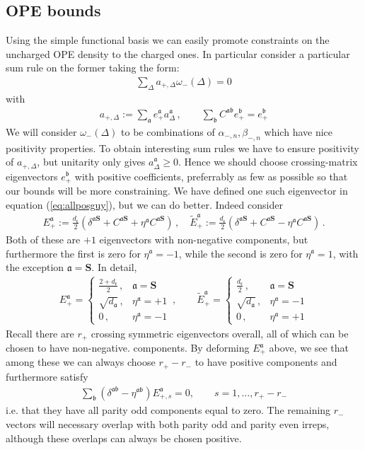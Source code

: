 \documentclass[12pt]{article}
\numberwithin{equation}{section}
\newcommand{\reef}[1]{(\ref{#1})}
\newcommand{\bea}{\begin{eqnarray}}
\newcommand{\eea}{\end{eqnarray}}
\newcommand{\mbf}{\mathbf}
\newcommand{\mf}[1]{\mathfrak #1}
\begin{document}
	\subsection{OPE bounds}
	\label{sec:opebounds}
	Using the simple functional basis we can easily promote constraints on the uncharged OPE density to the charged ones. In particular consider a particular sum rule on the former taking the form:
	\bea
	\sum_{\Delta} a_{+,\Delta} \omega_-(\Delta)=0
	\eea
	with
	\bea
	a_{+,\Delta}:=\sum_{\mf a} e^{\mf a}_+ a^{\mf a}_{\Delta}\,, \qquad \sum_{\mf b} C^{\mf a \mf b} e_{+}^{\mf b}=e_{+}^{\mf b}
	\eea
	We will consider $\omega_-(\Delta)$ to be combinations of $\alpha_{-,n}, \beta_{-,n}$ which have nice positivity properties. To obtain interesting sum rules we have to ensure positivity of $a_{+,\Delta}$, but unitarity only gives $a^{\mf a}_\Delta\geq 0$. Hence we should choose crossing-matrix eigenvectors $e_+^{\mf b}$ with positive coefficients, preferrably as few as possible so that our bounds will be more constraining. We have defined one such eigenvector in equation \reef{eq:allposguy}, but we can do better. Indeed consider
	\bea
	E_{+}^{\mf a}:=\frac{d_{\mf r}}2\left(\delta^{\mf a \mbf S}+C^{\mf a \mbf S}+\eta^{\mf a} C^{\mf a \mbf S}\right)\,,\quad \tilde E_{+}^{\mf a}:=\frac {d_{\mf r}}2\left(\delta^{\mf a \mbf S}+C^{\mf a \mbf S}-\eta^{\mf a} C^{\mf a \mbf S}\right)\,.
	\eea
	Both of these are $+1$ eigenvectors with non-negative components, but furthermore the first is zero for $\eta^{\mf a}=-1$, while the second is zero for $\eta^{\mf a}=1$, with the exception $\mf a =\mbf S$. In detail,
	\bea
	E_+^{\mf a}=\left\{
	\begin{array}{lr}
		\frac{2+d_{\mf r}}2\,,& \mf a=\mbf S\\
		\sqrt{d_{\mf a}}\,, &	\eta^{\mf a}=+1\\
		0\,, &	\eta^{\mf a}=-1
	\end{array}
	\right.\,, \qquad
	\tilde E_+^{\mf a}=\left\{
	\begin{array}{lr}
		\frac{d_{\mf r}}2\,,& \mf a=\mbf S\\
		\sqrt{d_{\mf a}}\,, &	\eta^{\mf a}=-1\\
		0\,, &	\eta^{\mf a}=+1
	\end{array}
	\right.
	\eea
	Recall there are $r_+$ crossing symmetric eigenvectors overall, all of which can be chosen to have non-negative. components. By deforming $E_+^{\mf a}$ above, we see that among these we can always choose $r_+-r_-$ to have positive components and furthermore satisfy
	\bea
	\sum_{\mf b}(\delta^{\mf a \mf b}-\eta^{\mf a \mf b}) E_{+,s}^{\mf a}=0, \qquad s=1,\ldots, r_+-r_-
	\eea
	i.e. that they have all parity odd components equal to zero.
	The remaining $r_-$ vectors will necessary overlap with both parity odd and parity even irreps, although these overlaps can always be chosen positive.
	
\end{document}
